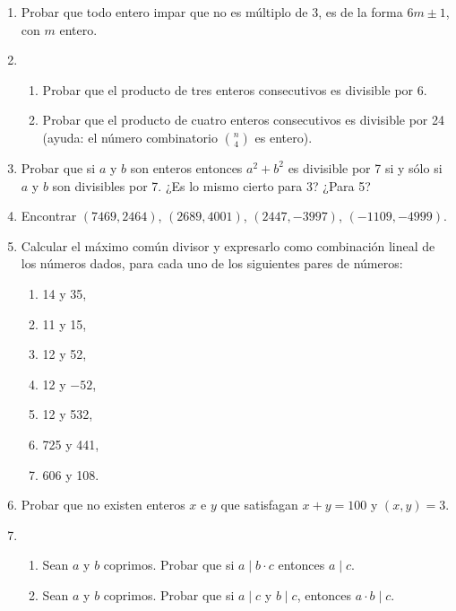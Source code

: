 \documentclass[12pt,spanish,makeidx]{amsbook}
\begin{document}
\begin{enumerate}
\smallskip
\item Probar que todo entero impar que no es múltiplo de 3, es de la forma $6m\pm 1$, con $m$ entero.

\smallskip

\item 
\begin{enumerate}
 \item Probar que el producto de tres enteros consecutivos es divisible por 6.
 \item Probar que el producto de cuatro enteros consecutivos es divisible por 24 (ayuda: el número combinatorio $\binom{n}{4}$ es entero).
\end{enumerate}


\smallskip
\item Probar que si $a$ y $b$ son enteros entonces $a^2+b^2$ es divisible por 7 si y sólo si $a$ y $b$ son divisibles por 7.
¿Es lo mismo cierto para 3? ¿Para 5?

\smallskip


\item Encontrar $(7469,2464)$, $(2689,4001)$, $(2447,-3997)$, $(-1109,-4999)$.

\smallskip

\item
Calcular el máximo común divisor y expresarlo como combinación lineal de los
números dados, para cada uno de  los siguientes pares de números:
\begin{multicols}{3}
\begin{enumerate}
  \item  14 y 35, 
	\item 11 y 15, 
	\item 12 y 52,
  \item 12 y $-52$,  
	\item 12 y 532,
	\item 725 y 441,
	\item 606 y 108.
\end{enumerate}
\end{multicols}



\smallskip

\item Probar que no existen enteros $x$ e $y$ que satisfagan $x+y=100$ y $(x,y)=3$.

\smallskip

\item %
\begin{enumerate}
 \item Sean $a$ y $b$ coprimos. Probar que si $a\mid b\cdot c$ entonces $a \mid c$.
 \item Sean $a$ y $b$ coprimos. Probar que si $a \mid c$ y $b \mid c$, entonces $a\cdot b \mid c$.


\end{enumerate}
\end{enumerate}
\end{document}
